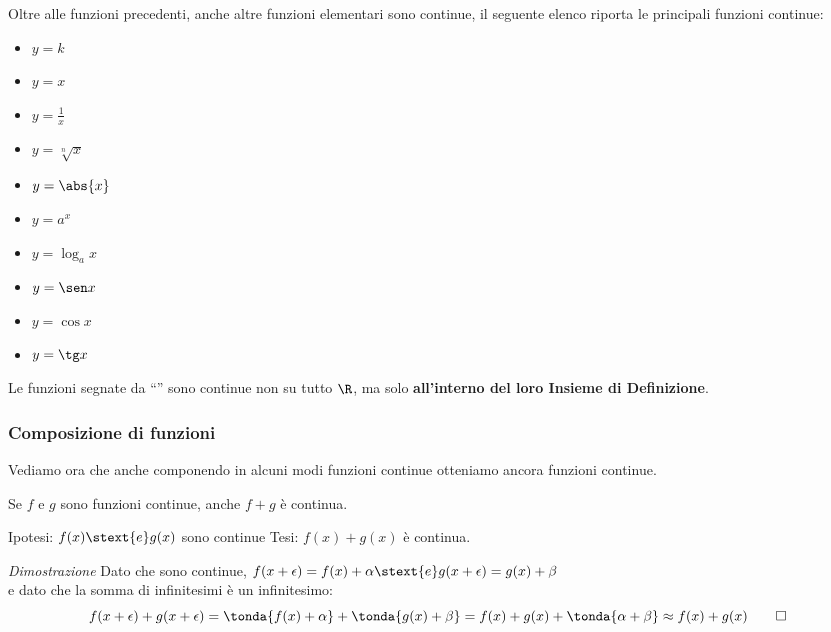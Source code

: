 
\noindent\begin{minipage}{\textwidth}
Oltre alle funzioni precedenti, anche altre funzioni elementari sono 
continue, il seguente elenco riporta le principali funzioni continue:

\noindent\begin{minipage}{1.05\textwidth}
\begin{multicols}{5}
\begin{itemize} [noitemsep]
 \item \(y=k\)
 \item \(y=x\)
 \item \(y=\frac{1}{x}\)  \textasteriskcentered
 \item \(y=\sqrt[n]{x}\)  \textasteriskcentered
 \item \(y=\abs{x}\)
 \item \(y=a^x\)
 \item \(y=\log_a x\)  \textasteriskcentered
 \item \(y=\sen x\)
 \item \(y=\cos x\)
 \item \(y=\tg x\)  \textasteriskcentered
\end{itemize}
\end{multicols}
\end{minipage}

\begin{osservazione}
Le funzioni segnate da ``\textasteriskcentered'' sono continue non su 
tutto \(\R\), 
ma solo \textbf{all'interno del loro Insieme di Definizione}.
\end{osservazione}
\end{minipage}

\subsubsection{Composizione di funzioni}
\label{subsubsec:cont_composizionefunzioni}

Vediamo ora che anche componendo in alcuni modi funzioni continue otteniamo 
ancora funzioni continue.

\begin{teorema}
Se \(f\) e \(g\) sono funzioni continue, anche \(f+g\) è continua.
\end{teorema}

\noindent Ipotesi: 
\(f(x) \stext{e} g(x)\) sono continue
\tab Tesi: 
\(f(x)+g(x)\) è continua.

\emph{Dimostrazione}
Dato che sono continue, 
\(f(x+\epsilon) = f(x)+\alpha \stext{ e } g(x+\epsilon) = g(x)+\beta\) \\
e dato che la somma di infinitesimi è un infinitesimo:
\[f(x+\epsilon) + g(x+\epsilon) = 
\tonda{f(x)+\alpha} + \tonda{g(x)+\beta} = 
f(x)+g(x)+\tonda{\alpha + \beta} \approx f(x)+g(x) \qed\]

